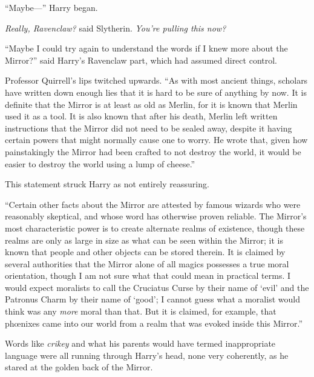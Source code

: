 “Maybe—” Harry began.

\emph{Really, Ravenclaw?} said Slytherin. \emph{You’re pulling this \emph{now?}}

“Maybe I could try again to understand the words if I knew more about the Mirror?” said Harry’s Ravenclaw part, which had assumed direct control.

Professor Quirrell’s lips twitched upwards. “As with most ancient things, scholars have written down enough lies that it is hard to be sure of anything by now. It is definite that the Mirror is at least as old as Merlin, for it is known that Merlin used it as a tool. It is also known that after his death, Merlin left written instructions that the Mirror did not need to be sealed away, despite it having certain powers that might normally cause one to worry. He wrote that, given how painstakingly the Mirror had been crafted to not destroy the world, it would be easier to destroy the world using a lump of cheese.”

This statement struck Harry as not entirely reassuring.

“Certain other facts about the Mirror are attested by famous wizards who were reasonably skeptical, and whose word has otherwise proven reliable. The Mirror’s most characteristic power is to create alternate realms of existence, though these realms are only as large in size as what can be seen within the Mirror; it is known that people and other objects can be stored therein. It is claimed by several authorities that the Mirror alone of all magics possesses a true moral orientation, though I am not sure what that could mean in practical terms. I would expect moralists to call the Cruciatus Curse by their name of ‘evil’ and the Patronus Charm by their name of ‘good’; I cannot guess what a moralist would think was any \emph{more} moral than that. But it is claimed, for example, that phœnixes came into our world from a realm that was evoked inside this Mirror.”

Words like \emph{crikey} and what his parents would have termed inappropriate language were all running through Harry’s head, none very coherently, as he stared at the golden back of the Mirror.

